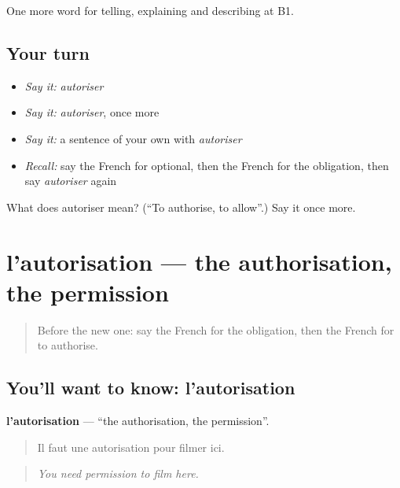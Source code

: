 \begin{grammarlens}[title={What you've built}]
One more word for telling, explaining and describing at B1.
\end{grammarlens}

\subsection*{Your turn}
\begin{itemize}
\raggedright
  \item \emph{Say it:} \emph{autoriser}
  \item \emph{Say it:} \emph{autoriser}, once more
  \item \emph{Say it:} a sentence of your own with \emph{autoriser}
  \item \emph{Recall:} say the French for optional, then the French for the obligation, then say \emph{autoriser} again
\end{itemize}

\begin{tcolorbox}[breakable,colback=teal!4,colframe=teal!35!black,title={Before you move on}]
What does autoriser mean? (\textquotedblleft{}To authorise, to allow\textquotedblright{}.) Say it once more.
\end{tcolorbox}
\section[l'autorisation]{l'autorisation — the authorisation, the permission}

\label{lesson:FR-C381-autorisation}



\begin{quote}
Before the new one: say the French for the obligation, then the French for to authorise.
\end{quote}

\subsection*{You'll want to know: l'autorisation}
\textbf{l'autorisation} — \textquotedblleft{}the authorisation, the permission\textquotedblright{}.

\begin{quote}
Il faut une autorisation pour filmer ici.
\end{quote}

\begin{quote}
\emph{You need permission to film here.}
\end{quote}

